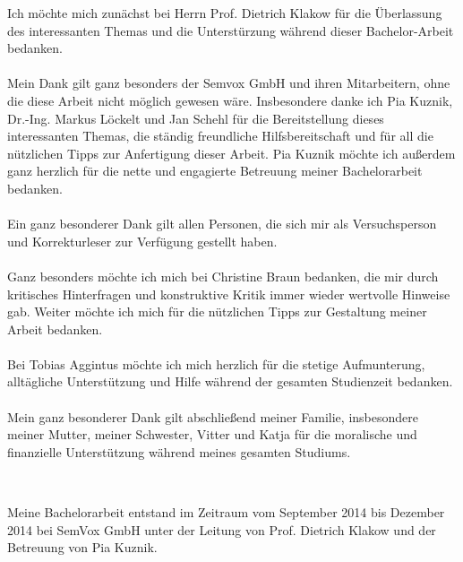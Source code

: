 \documentclass[12pt,a4paper]{scrartcl}
\begin{document}
Ich möchte mich zunächst bei Herrn Prof. Dietrich Klakow für die Überlassung des interessanten Themas und die Unterstürzung während dieser Bachelor-Arbeit bedanken.\\
\\
Mein Dank gilt ganz besonders der Semvox GmbH und ihren Mitarbeitern, ohne die diese Arbeit nicht möglich gewesen wäre. Insbesondere danke ich Pia Kuznik, Dr.-Ing. Markus Löckelt und Jan Schehl für die Bereitstellung dieses interessanten Themas, die ständig freundliche Hilfsbereitschaft und für all die nützlichen Tipps zur Anfertigung dieser Arbeit. 
Pia Kuznik möchte ich außerdem ganz herzlich für die nette und engagierte Betreuung meiner Bachelorarbeit bedanken.\\
\\
Ein ganz besonderer Dank gilt allen Personen, die sich mir als Versuchsperson und Korrekturleser zur Verfügung
gestellt haben.\\
\\
Ganz besonders möchte ich mich bei Christine Braun bedanken, die mir durch kritisches Hinterfragen und konstruktive Kritik immer wieder wertvolle Hinweise gab. Weiter möchte ich mich für die nützlichen Tipps zur Gestaltung meiner Arbeit bedanken.\\
\\
Bei Tobias Aggintus möchte ich mich herzlich für die stetige Aufmunterung, alltägliche Unterstützung und Hilfe während der gesamten Studienzeit bedanken. \\
\\
Mein ganz besonderer Dank gilt abschließend meiner Familie, insbesondere meiner Mutter, meiner Schwester, Vitter und Katja für die moralische und finanzielle Unterstützung während meines gesamten Studiums. \\
\cleardoublepage

$\,$\\
\vfill
\markboth{ }{ }
Meine Bachelorarbeit entstand im Zeitraum vom September 2014 bis Dezember 2014 bei SemVox GmbH unter der Leitung von Prof. Dietrich Klakow und der Betreuung von Pia Kuznik.


\cleardoublepage




\cleardoublepage
\tableofcontents
\cleardoublepage

\end{document}
